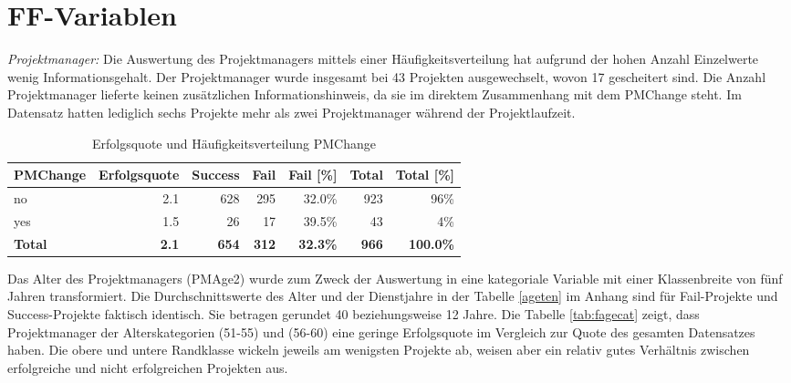 \section{FF-Variablen}
%
%
\textit{Projektmanager: } Die Auswertung des Projektmanagers mittels einer  Häufigkeitsverteilung hat aufgrund der hohen Anzahl Einzelwerte wenig Informationsgehalt.
\newline 
Der Projektmanager wurde insgesamt bei 43 Projekten ausgewechselt, wovon 17 gescheitert sind. Die Anzahl Projektmanager lieferte keinen zusätzlichen Informationshinweis, da sie im direktem Zusammenhang mit dem PMChange steht. Im Datensatz hatten lediglich sechs Projekte mehr als zwei Projektmanager während der Projektlaufzeit.
\begin{table}[H]
	\centering
	\caption{Erfolgsquote und Häufigkeitsverteilung PMChange}
	\begin{tabular}{lrrrrrr}
		\toprule
		\textbf{PMChange} & \multicolumn{1}{l}{\textbf{Erfolgsquote}} & \multicolumn{1}{l}{\textbf{Success}} & \multicolumn{1}{l}{\textbf{Fail}} & \multicolumn{1}{l}{\textbf{Fail [\%]}} & \multicolumn{1}{l}{\textbf{Total}} &
		\multicolumn{1}{l}{\textbf{Total [\%]}} \\
		\midrule
		no    & 2.1 & 628   & 295   & 32.0\% & 923 & 96\% \\
		yes   & 1.5 & 26    & 17    & 39.5\% & 43  & 4\% \\
		\bottomrule
		\textbf{Total} & \textbf{2.1} & \textbf{654} & \textbf{312} & \textbf{32.3\%} & \textbf{966} & \textbf{100.0\%} \\
	\end{tabular}%
	\label{pmchange}%
\end{table}%
Das Alter des Projektmanagers (PMAge2) wurde zum Zweck der Auswertung in eine kategoriale Variable mit einer Klassenbreite von fünf Jahren transformiert. Die Durchschnittswerte des Alter und der Dienstjahre in der Tabelle \ref{ageten} im Anhang sind für Fail-Projekte und Success-Projekte faktisch identisch. Sie betragen gerundet 40 beziehungsweise 12 Jahre. Die Tabelle \ref{tab:fagecat} zeigt, dass Projektmanager der Alterskategorien (51-55) und (56-60) eine geringe Erfolgsquote im Vergleich zur Quote des gesamten Datensatzes haben. Die obere und untere Randklasse wickeln jeweils am wenigsten Projekte ab, weisen aber ein relativ gutes Verhältnis zwischen erfolgreiche und nicht erfolgreichen Projekten aus.
